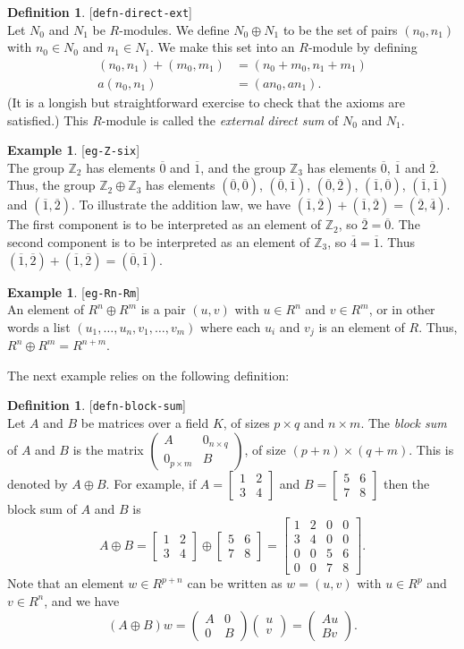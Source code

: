 \documentclass{amsart}
\newcommand{\lbl}[1]{\label{#1}\textup{[\texttt{#1}]}\ \\}
\newcommand{\lbl}{\label}
\newcommand{\bbm}       {\left[\begin{matrix}}
\newcommand{\bsm}       {\left[\begin{smallmatrix}}
\newcommand{\ebm}       {\end{matrix}\right]}
\newcommand{\esm}       {\end{smallmatrix}\right]}
\newcommand{\Z}         {{\mathbb{Z}}}
\newcommand{\ov}[1]     {\overline{#1}}
\newcommand{\tm}        {\times}
\newcommand{\op}        {\oplus}
\newcommand{\blockmat}[4]{
 \left(\begin{array}{c|c} #1&#2 \\ \hline #3&#4\end{array}\right)}
\newcommand{\blockvec}[2]{
 \left(\begin{array}{c} #1 \\ \hline #2\end{array}\right)}
\renewcommand{\:}{\colon}
\theoremstyle{definition}
\newtheorem{definition}[theorem]{Definition}
\newtheorem{example}[theorem]{Example}
\begin{document}
\begin{definition}\lbl{defn-direct-ext}
 Let $N_0$ and $N_1$ be $R$-modules.  We define $N_0\op N_1$ to be the
 set of pairs $(n_0,n_1)$ with $n_0\in N_0$ and $n_1\in N_1$.  We make
 this set into an $R$-module by defining
 \begin{align*}
  (n_0,n_1) + (m_0,m_1) &= (n_0+m_0,n_1+m_1) \\
  a (n_0,n_1) &= (an_0,an_1).
 \end{align*}
 (It is a longish but straightforward exercise to check that the
 axioms are satisfied.)  This $R$-module is called the \emph{external
 direct sum} of $N_0$ and $N_1$.
\end{definition}
\begin{example}\lbl{eg-Z-six}
 The group $\Z_2$ has elements $\ov{0}$ and $\ov{1}$, and the group
 $\Z_3$ has elements $\ov{0}$, $\ov{1}$ and $\ov{2}$.  Thus, the group
 $\Z_2\op\Z_3$ has elements $(\ov{0},\ov{0})$, $(\ov{0},\ov{1})$,
 $(\ov{0},\ov{2})$, $(\ov{1},\ov{0})$, $(\ov{1},\ov{1})$ and
 $(\ov{1},\ov{2})$.  To illustrate the addition law, we have
 $(\ov{1},\ov{2})+(\ov{1},\ov{2})=(\ov{2},\ov{4})$.  The first
 component is to be interpreted as an element of $\Z_2$, so
 $\ov{2}=\ov{0}$.  The second component is to be interpreted as an
 element of $\Z_3$, so $\ov{4}=\ov{1}$.  Thus
 $(\ov{1},\ov{2})+(\ov{1},\ov{2})=(\ov{0},\ov{1})$.
\end{example}
\begin{example}\lbl{eg-Rn-Rm}
 An element of $R^n\op R^m$ is a pair $(u,v)$ with $u\in R^n$ and
 $v\in R^m$, or in other words a list
 $(u_1,\ldots,u_n,v_1,\ldots,v_m)$ where each $u_i$ and $v_j$ is an
 element of $R$.  Thus, $R^n\op R^m=R^{n+m}$.
\end{example}
The next example relies on the following definition:
\begin{definition}\lbl{defn-block-sum}
 Let $A$ and $B$ be matrices over a field $K$, of sizes $p\tm q$ and
 $n\tm m$.  The \emph{block sum} of $A$ and $B$ is the matrix
 $\blockmat{A}{0_{n\tm q}}{0_{p\tm m}}{B}$, of size $(p+n)\tm(q+m)$.
 This is denoted by $A\op B$.  For example, if $A=\bsm 1&2\\3&4\esm$
 and $B=\bsm 5&6\\7&8\esm$ then the block sum of $A$ and $B$ is 
 \[ A\op B = \bbm 1&2\\3&4\ebm\op\bbm 5&6\\7&8\ebm = 
     \bbm 1&2&0&0\\3&4&0&0\\0&0&5&6\\0&0&7&8 \ebm.
 \]
 Note that an element $w\in R^{p+n}$ can be written as $w=(u,v)$ with
 $u\in R^p$ and $v\in R^n$, and we have
 \[ (A\op B)w = \blockmat{A}{0}{0}{B} \blockvec{u}{v} = 
     \blockvec{Au}{Bv}.
 \]
\end{definition}
\end{document}
